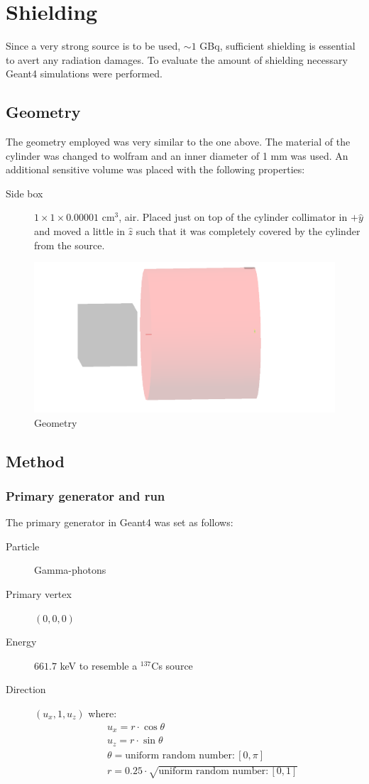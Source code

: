 \documentclass[a4paper]{article}
\begin{document}
\section{Shielding}
Since a very strong source is to be used,  $\sim 1$ GBq, sufficient shielding is essential to avert any radiation damages. To evaluate the amount of shielding necessary Geant4 simulations were performed.
\subsection{Geometry}
The geometry employed was very similar to the one above. The material of the cylinder was changed to wolfram and an inner diameter of 1 mm was used. An additional sensitive volume was placed with the following properties:
\begin{description}
  \item[Side box] $1\times1\times0.00001$ cm$^3$, air. Placed just on top of the cylinder collimator in $+\hat{y}$ and moved a little in $\hat{z}$ such that it was completely covered by the cylinder from the source.
\end{description}
\begin{figure}[H]
  \centering
  \includegraphics[width=\textwidth]{geometry2.png}
  \caption{Geometry}
  \label{fig:geometry2}
\end{figure}
\subsection{Method}
\subsubsection{Primary generator and run}
The primary generator in Geant4 was set as follows:
\begin{description}
  \item[Particle] Gamma-photons
  \item[Primary vertex] $(0,0,0)$
  \item[Energy] $661.7$ keV to resemble a $^{137}$Cs source
  \item[Direction] $(u_x, 1, u_z)$ where:
  \begin{align}
    &u_x = r \cdot \cos \theta \\
    &u_z = r \cdot \sin \theta \\
    &\theta = \text{uniform random number}: [0, \pi] \\
    &r = 0.25 \cdot \sqrt{\text{uniform random number}: [0, 1]}
    \label{eq:GDir2}
  \end{align}
\end{description}
\end{document}
